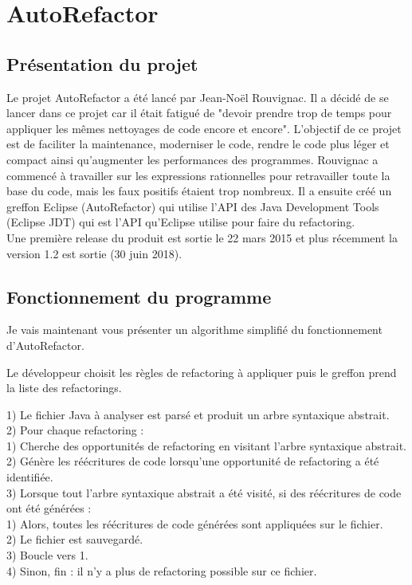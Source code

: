 \documentclass[a4paper,twoside,12pt,openright]{report}
\begin{document}
\newpage

\section{AutoRefactor}
\subsection{Présentation du projet}
Le projet AutoRefactor a été lancé par Jean-Noël Rouvignac. Il a décidé de se lancer dans ce projet car il était fatigué de "devoir prendre trop de temps pour appliquer les mêmes nettoyages de code encore et encore". L'objectif de ce projet est de faciliter la maintenance, moderniser le code, rendre le code plus léger et compact ainsi qu'augmenter les performances des programmes. Rouvignac a commencé à travailler sur les expressions rationnelles pour retravailler toute la base du code, mais les faux positifs étaient trop nombreux.\cite{ref7} Il a ensuite créé un greffon Eclipse (AutoRefactor) qui utilise  l'API des Java Development Tools (Eclipse JDT) qui est l'API qu'Eclipse utilise pour faire du refactoring.\\
Une première release du produit est sortie le 22 mars 2015 et plus récemment la version 1.2 est sortie (30 juin 2018).\\

\subsection{Fonctionnement du programme}
Je vais maintenant vous présenter un algorithme simplifié du fonctionnement d'AutoRefactor\cite{ref7}.

Le développeur choisit les règles de refactoring à appliquer puis le greffon prend la liste des refactorings.

1) Le fichier Java à analyser est parsé et produit un arbre syntaxique abstrait.\\

2) Pour chaque refactoring :\\
\tabto{0.8cm} 1) Cherche des opportunités de refactoring en visitant l'arbre syntaxique abstrait.\\
\tabto{0.8cm} 2) Génère les réécritures de code lorsqu'une  opportunité de refactoring a été identifiée.\\

3) Lorsque tout l'arbre syntaxique abstrait a été visité, si des réécritures de code ont été générées :\\
\tabto{0.8cm} 1) Alors, toutes les réécritures de code générées sont appliquées sur le fichier.\\
\tabto{0.8cm} 2) Le fichier est sauvegardé.\\
\tabto{0.8cm} 3) Boucle vers 1.\\
\tabto{0.8cm} 4) Sinon, fin : il n'y a plus de refactoring possible sur ce fichier.\\
\end{document}
